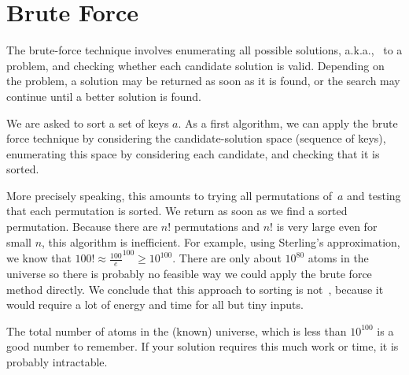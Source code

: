 \section{Brute Force}
\label{sec:design::bf}

\begin{cluster}
\label{grp:grm:design::basics::brute-force}

\begin{gram}
\label{grm:design::basics::brute-force}
The brute-force technique involves enumerating all possible solutions,
a.k.a.,~ to a problem, and checking whether
each candidate solution is valid.
Depending on the problem, a solution may be returned as soon as it is
found, or the search may continue until a better solution is found.

\end{gram}
\end{cluster}

\begin{cluster}
\label{grp:xmpl:design::basics::brute-force-sorting}

\begin{example}
\label{xmpl:design::basics::brute-force-sorting}
We are asked to sort a set of keys $a$.
As a first algorithm, we can apply the brute force technique by
considering the candidate-solution space (sequence of keys),
enumerating this space by considering each candidate, and checking
that it is sorted. 

More precisely speaking, this amounts to trying all permutations
of~$a$ and testing that each permutation is sorted. 
We return as soon as we find a sorted permutation.
Because there are $n!$ permutations and $n!$ is very large even
for small $n$, this algorithm is inefficient.
For example, using Sterling's approximation, 
we know that  $100! \approx \frac{100}{e}^{100} \ge 10^{100}$.
There are only about $10^{80}$ atoms in the universe so there is
probably no feasible way we could apply the brute force method
directly.
We conclude that this approach to sorting is
not~, because it would require a lot of energy and time for all but  tiny inputs.

\end{example}
\end{cluster}

\begin{cluster}
\label{grp:rmrk:design::basics::total}

\begin{remark}
\label{rmrk:design::basics::total}
The total number of atoms in the (known) universe, which is less than
$10^{100}$ is a good number to remember.
If your solution requires this much work or time, it is probably
intractable.

\end{remark}
\end{cluster}

